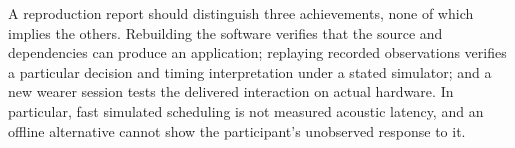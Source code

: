 A reproduction report should distinguish three achievements, none of which implies the others. Rebuilding the software verifies that the source and dependencies can produce an application; replaying recorded observations verifies a particular decision and timing interpretation under a stated simulator; and a new wearer session tests the delivered interaction on actual hardware. In particular, fast simulated scheduling is not measured acoustic latency, and an offline alternative cannot show the participant's unobserved response to it.
